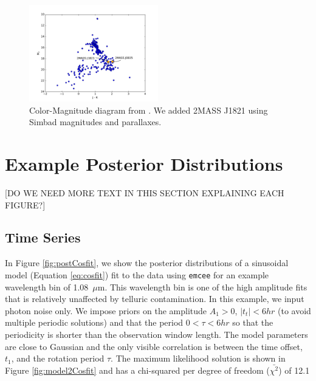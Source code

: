 \documentclass[manuscript]{aastex6}
\begin{document}
\begin{figure}
\begin{centering}
\includegraphics[width=0.5\textwidth]{color_mag.pdf}
\caption{Color-Magnitude diagram from \citet{dupuy2012ltparallax}. We added 2MASS J1821 using Simbad magnitudes and parallaxes.}\label{fig:CMD}
\end{centering}
\end{figure}

\pagebreak
\section{Example Posterior Distributions}
[DO WE NEED MORE TEXT IN THIS SECTION EXPLAINING EACH FIGURE?]
\subsection{Time Series}
In Figure \ref{fig:postCosfit}, we show the posterior distributions of a sinusoidal model (Equation \ref{eq:cosfit}) fit to the data using \texttt{emcee} \citep{foreman-mackey2013emcee} for an example wavelength bin of 1.08~$\mu$m.
This wavelength bin is one of the high amplitude fits that is relatively unaffected by telluric contamination.
In this example, we input photon noise only.
We impose priors on the amplitude $A_1 > 0$, $|t_t| < 6 hr$ (to avoid multiple periodic solutions) and that the period $0 < \tau < 6 hr$ so that the periodicity is shorter than the observation window length.
The model parameters are close to Gaussian and the only visible correlation is between the time offset, $t_1$, and the rotation period $\tau$.
The maximum likelihood solution is shown in Figure \ref{fig:model2Cosfit} and has a chi-squared per degree of freedom ($\bar{\chi^2}$) of 12.1
\end{document}
